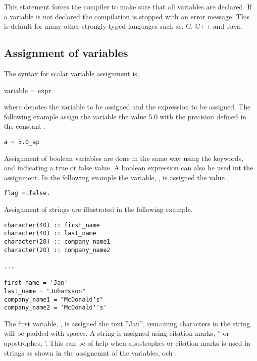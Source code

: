 This statement forces the compiler to make sure that all variables are declared. If a variable is not declared the compilation is stopped with an error message. This is default for many other strongly typed languages such as, C, C++ and Java.

\subsection{Assignment of variables}

The syntax for scalar variable assignment is, 

\begin{fsyntax}
variable = expr
\end{fsyntax}

where  denotes the variable to be assigned and  the expression to be assigned. The following example assign the  variable the value 5.0 with the precision defined in the constant .

\begin{lstlisting}
a = 5.0_ap
\end{lstlisting}

Assignment of boolean variables are done in the same way using the keywords,  and  indicating a true or false value. A boolean expression can also be used int the assignment. In the following example the variable, , is assigned the value .

\begin{lstlisting}
flag =.false.
\end{lstlisting}

Assignment of strings are illustrated in the following example. 

\begin{lstlisting}
character(40) :: first_name
character(40) :: last_name
character(20) :: company_name1
character(20) :: company_name2

...

first_name = 'Jan'
last_name = "Johansson"
company_name1 = "McDonald's"
company_name2 = 'McDonald''s'
\end{lstlisting}

The first variable, , is assigned the text ''Jan'', remaining characters in the string will be padded with spaces. A string is assigned using citation marks, '' or apostrophes, '. This can be of help when apostrophes or citation marks is used in strings as shown in the assignemnt of the variables,  och .


